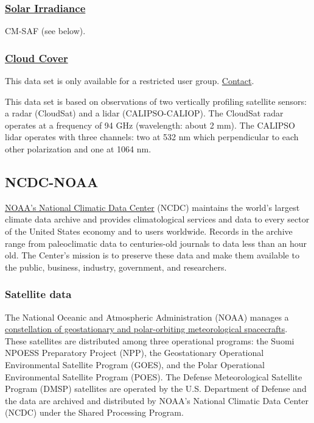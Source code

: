 \documentclass[11pt]{article}
\begin{document}
\subsubsection{\href{http://icdc.zmaw.de/icdc_home.html?&L=1}{Solar Irradiance}}
\label{sec-1-3-2}

CM-SAF (see below).
\subsubsection{\href{http://icdc.zmaw.de/calipso-cloudsat_cloudcover.html?&L=1}{Cloud Cover}}
\label{sec-1-3-3}

This data set is only available for a restricted user
group. \href{http://icdc.zmaw.de/beratung.html?&L=1}{Contact}.

This data set is based on observations of two vertically profiling
  satellite sensors: a radar (CloudSat) and a lidar
  (CALIPSO-CALIOP). The CloudSat radar operates at a frequency of 94
  GHz (wavelength: about 2 mm). The CALIPSO lidar operates with three
  channels: two at 532 nm which perpendicular to each other
  polarization and one at 1064 nm.

\subsection{NCDC-NOAA}
\label{sec-1-4}

\href{http://www.ncdc.noaa.gov/}{NOAA’s National Climatic Data Center} (NCDC) maintains the world's
largest climate data archive and provides climatological services
and data to every sector of the United States economy and to users
worldwide. Records in the archive range from paleoclimatic data to
centuries-old journals to data less than an hour old. The Center's
mission is to preserve these data and make them available to the
public, business, industry, government, and researchers.


\subsubsection{Satellite data}
\label{sec-1-4-1}

The National Oceanic and Atmospheric Administration (NOAA) manages
a \href{http://www.ncdc.noaa.gov/satellite-data}{constellation of geostationary and polar-orbiting meteorological
spacecrafts}. These satellites are distributed among three
operational programs: the Suomi NPOESS Preparatory Project (NPP),
the Geostationary Operational Environmental Satellite Program
(GOES), and the Polar Operational Environmental Satellite Program
(POES). The Defense Meteorological Satellite Program (DMSP)
satellites are operated by the U.S. Department of Defense and the
data are archived and distributed by NOAA's National Climatic Data
Center (NCDC) under the Shared Processing Program.
\end{document}
